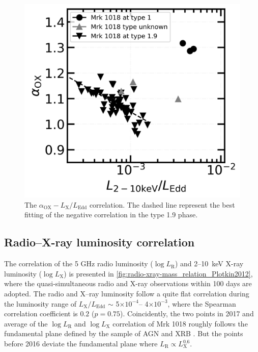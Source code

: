 \begin{figure}
\centering
	\includegraphics[width=\linewidth]{./pic/Mrk1018_2individuals_alpha_ox_L2-10.png}
    \caption{The $\alpha_\mathrm{OX}-L_{\mathrm{X}}/L_\mathrm{Edd}$ correlation. The dashed line represent the best fitting of the negative correlation in the type 1.9 phase.}   
    \label{fig:alpha_ox_lx}
\end{figure}


\subsection{Radio--X-ray luminosity correlation}
The correlation of the 5 GHz radio luminosity ($\log L_\mathrm{R}$) and 2--10~keV X-ray luminosity ($\log L_\mathrm{X}$) is presented in \autoref{fig:radio-xray-mass_relation_Plotkin2012}, where the quasi-simultaneous radio and X-ray observations within 100 days are adopted. The radio and X--ray luminosity follow a quite flat correlation during the luminosity range of $L_\mathrm{X}/L_\mathrm{Edd}$ $\sim$ 5$\times 10^{-4}$-- 4$\times 10^{-3}$, where the Spearman correlation coefficient is $0.2$ ($p=0.75$). Coincidently, the two points in 2017 and average of the $\log L_\mathrm{R}$ and $\log L_\mathrm{X}$ correlation of Mrk 1018 roughly follows the fundamental plane defined by the sample of AGN and XRB \citep[e.g.][]{2012MNRAS.419..267P}. But the points before 2016 deviate the fundamental plane where $L_\mathrm{R}\propto L_\mathrm{X}^{0.6}$.




